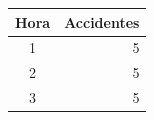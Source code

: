 \begin{tabular}{cr}
\toprule
Hora & Accidentes \\
\midrule
1 & 5 \\
2 & 5 \\
3 & 5 \\
\bottomrule
\end{tabular}
